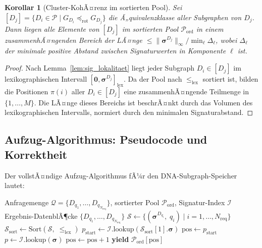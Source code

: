 ﻿\documentclass[a4paper,12pt]{article}
\theoremstyle{definition}
\theoremstyle{plain}
\newtheorem{korollar}{Korollar}[section]
\begin{document}
\begin{korollar}[Cluster-KohÃ¤renz im sortierten Pool]
\label{kor:cluster}
  Sei $[D_j] = \{D_i \in \mathcal{P} \mid G_{D_i} \preceq_{\mathrm{rot}} G_{D_j}\}$
  die Ã„quivalenzklasse aller Subgraphen von $D_j$.  Dann liegen alle
  Elemente von $[D_j]$ im sortierten Pool $\mathcal{P}_{\mathrm{ord}}$
  in einem zusammenhÃ¤ngenden Bereich der LÃ¤nge
  $\le \|\boldsymbol{\sigma}^{D_j}\|_\infty / \min_\ell \Delta_\ell$,
  wobei $\Delta_\ell$ der minimale positive Abstand zwischen
  Signaturwerten in Komponente $\ell$ ist.
\end{korollar}

\begin{proof}
  Nach Lemma~\ref{lem:sig_lokalitaet} liegt jeder Subgraph
  $D_i \in [D_j]$ im lexikographischen Intervall
  $[\mathbf{0}, \boldsymbol{\sigma}^{D_j}]_{\mathrm{lex}}$.
  Da der Pool nach $\le_{\mathrm{lex}}$ sortiert ist, bilden die
  Positionen $\pi(i)$ aller $D_i \in [D_j]$ eine zusammenhÃ¤ngende
  Teilmenge in $\{1, \ldots, M\}$.  Die LÃ¤nge dieses Bereichs ist
  beschrÃ¤nkt durch das Volumen des lexikographischen Intervalls,
  normiert durch den minimalen Signaturabstand. 
\end{proof}

\subsection{Aufzug-Algorithmus: Pseudocode und Korrektheit}
\label{ssec:elevator_algo}

Der vollstÃ¤ndige Aufzug-Algorithmus fÃ¼r den DNA-Subgraph-Speicher
lautet:

\begin{algorithm}[H]
\caption{DNA-Aufzug-Retrieval}
\label{algo:elevator}
\begin{algorithmic}[1]
\Require Anfragemenge $\mathcal{Q} = \{D_{q_1}, \ldots, D_{q_{N_{\mathrm{req}}}}\}$,
         sortierter Pool $\mathcal{P}_{\mathrm{ord}}$, Signatur-Index $\mathcal{I}$
\Ensure Ergebnis-DatenblÃ¶cke $\{D_{q_1}, \ldots, D_{q_{N_{\mathrm{req}}}}\}$ 
\State $\mathcal{S} \gets \{(\boldsymbol{\sigma}^{D_{q_i}},\; q_i) \mid i = 1, \ldots, N_{\mathrm{req}}\}$
\State $\mathcal{S}_{\mathrm{sort}} \gets \mathrm{Sort}(\mathcal{S},\; \le_{\mathrm{lex}})$
\State $p_{\mathrm{start}} \gets \mathcal{I}.\mathrm{lookup}(\mathcal{S}_{\mathrm{sort}}[1].\boldsymbol{\sigma})$
\State $\mathrm{pos} \gets p_{\mathrm{start}}$
  \State $p \gets \mathcal{I}.\mathrm{lookup}(\boldsymbol{\sigma})$
    \State $\mathrm{pos} \gets \mathrm{pos} + 1$
  \EndWhile
  \State \textbf{yield} $\mathcal{P}_{\mathrm{ord}}[\mathrm{pos}]$
\EndFor
\end{algorithmic}
\end{algorithm}
\end{document}
